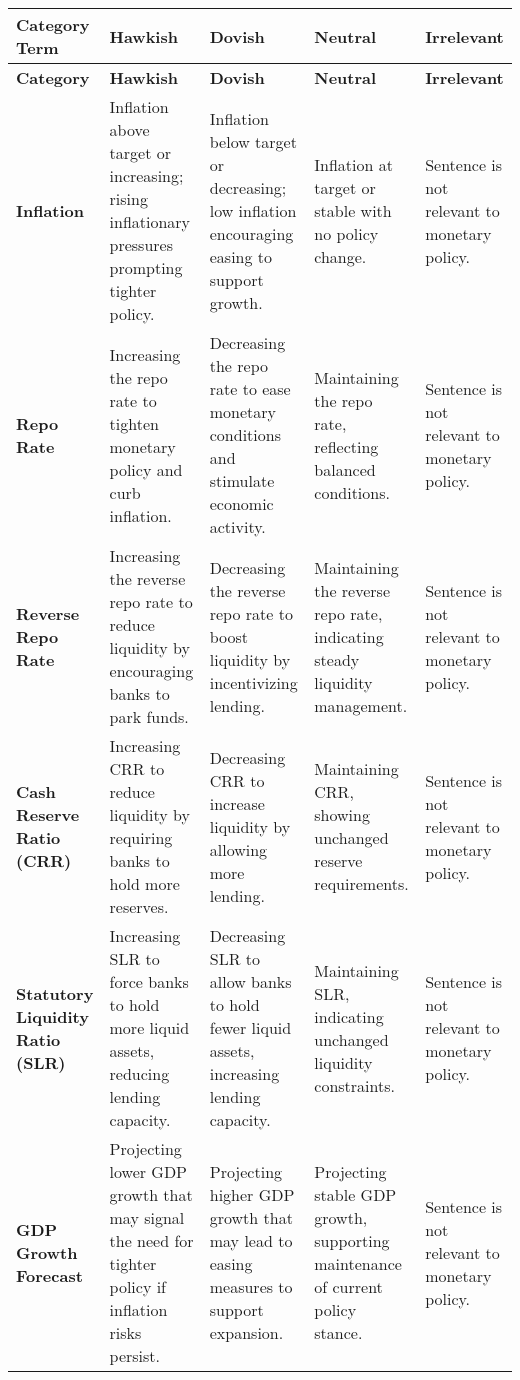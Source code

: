 \begin{longtable}{p{}p{}p{}p{}p{}}
\caption{} \label{tb:rbi_mp_stance_guide}
\\
\toprule
\textbf{Category Term} & \textbf{Hawkish} & \textbf{Dovish} & \textbf{Neutral} & \textbf{Irrelevant} \\
\midrule
\endfirsthead

\toprule
\textbf{Category} & \textbf{Hawkish} & \textbf{Dovish} & \textbf{Neutral} & \textbf{Irrelevant} \\
\midrule
\endhead

\textbf{Inflation} & Inflation above target or increasing; rising inflationary pressures prompting tighter policy. & Inflation below target or decreasing; low inflation encouraging easing to support growth. & Inflation at target or stable with no policy change. & Sentence is not relevant to monetary policy. \\
\midrule
\textbf{Repo Rate} & Increasing the repo rate to tighten monetary policy and curb inflation. & Decreasing the repo rate to ease monetary conditions and stimulate economic activity. & Maintaining the repo rate, reflecting balanced conditions. & Sentence is not relevant to monetary policy. \\
\midrule
\textbf{Reverse Repo Rate} & Increasing the reverse repo rate to reduce liquidity by encouraging banks to park funds. & Decreasing the reverse repo rate to boost liquidity by incentivizing lending. & Maintaining the reverse repo rate, indicating steady liquidity management. & Sentence is not relevant to monetary policy. \\
\midrule
\textbf{Cash Reserve Ratio (CRR)} & Increasing CRR to reduce liquidity by requiring banks to hold more reserves. & Decreasing CRR to increase liquidity by allowing more lending. & Maintaining CRR, showing unchanged reserve requirements. & Sentence is not relevant to monetary policy. \\
\midrule
\textbf{Statutory Liquidity Ratio (SLR)} & Increasing SLR to force banks to hold more liquid assets, reducing lending capacity. & Decreasing SLR to allow banks to hold fewer liquid assets, increasing lending capacity. & Maintaining SLR, indicating unchanged liquidity constraints. & Sentence is not relevant to monetary policy. \\
\midrule
\textbf{GDP Growth Forecast} & Projecting lower GDP growth that may signal the need for tighter policy if inflation risks persist. & Projecting higher GDP growth that may lead to easing measures to support expansion. & Projecting stable GDP growth, supporting maintenance of current policy stance. & Sentence is not relevant to monetary policy. \\

\end{longtable}
